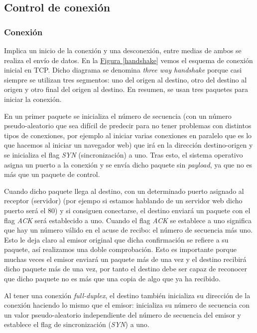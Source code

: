 \documentclass[10pt,a4paper,spanish]{report}
\begin{document}
\subsection{\textcolor{tema3}Control de conexión}
\subsubsection{\textcolor{tema3}Conexión}
Implica un inicio de la conexión y una desconexión, entre medias de ambos se realiza el envío de datos. En la \hyperref[handshake]{Figura \ref*{handshake}} vemos el esquema de conexión inicial en TCP. Dicho diagrama se denomina \textit{\textcolor{tema3}{three way handshake}} porque casi siempre se utilizan tres segmentos: uno del origen al destino, otro del destino al origen y otro final del origen al destino. En resumen, se usan tres paquetes para iniciar la conexión. 

En un primer paquete se inicializa el número de secuencia (con un número pseudo-aleatorio que sea difícil de predecir para no tener problemas con distintos tipos de conexiones, por ejemplo al iniciar varias conexiones en paralelo que es lo que hacemos al iniciar un navegador web) que irá en la dirección destino-origen y se inicializa el flag \textit{\textcolor{tema3}{SYN}} (sincronización) a uno. Tras esto, el sistema operativo asigna un puerto a la conexión y se envía dicho paquete sin \textcolor{tema3}{\textit{payload}}, ya que no es más que un paquete de control.

Cuando dicho paquete llega al destino, con un determinado puerto asignado al receptor (servidor) (por ejempo si estamos hablando de un servidor web dicho puerto será el 80) y si consiguen conectarse, el destino enviará un paquete con el flag \textcolor{tema3}{\textit{ACK}} será establecido a uno. Cuando el flag \textit{\textcolor{tema3}{ACK}} se establece a uno significa que hay un número válido en el acuse de recibo: el número de secuencia más uno. Esto le deja claro al emisor original que dicha confirmación se refiere a su paquete, así realizamos una doble comprobación. Esto es importante porque muchas veces el emisor enviará un paquete más de una vez y el destino recibirá dicho paquete más de una vez, por tanto el destino debe ser capaz de reconocer que dicho paquete no es más que una copia de algo que ya ha recibido.

Al tener una conexión \textit{\textcolor{tema3}{full-duplex}}, el destino también inicializa su dirección de la conexión haciendo lo mismo que el emisor: inicializa su número de secuencia con un valor pseudo-aleatorio independiente del número de secuencia del emisor y establece el flag de sincronización (\textcolor{tema3}{\textit{SYN}}) a uno.
\end{document}
